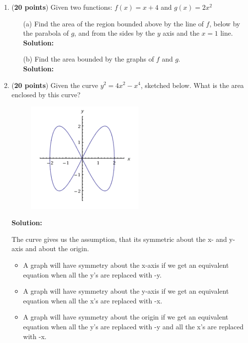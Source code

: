 \documentclass[a4paper]{article}
\begin{document}
\begin{enumerate}
	
\item (\textbf{20 points}) Given two functions: $f(x) = x + 4$ and $g(x) = 2x^2$

\begin{enumerate}
	\item[(a)] Find the area of the region bounded above by the line of $f$, below by the parabola of $g$, and from the sides by the $y$ axis and the $x = 1$ line.\\
	\textbf{Solution:}
	
	
	
	
	\item[(b)] Find the area bounded by the graphs of $f$ and $g$.\\
	\textbf{Solution:}
	
	
	
\end{enumerate}
	
\newpage	
	
	
	
	
	
\item (\textbf{20 points}) Given the curve $y^2 = 4x^2 - x^4$, sketched below. What is the area enclosed by this curve?\\
	
	\begin{figure}[ht]
	\centering
  \includegraphics[width=0.55\textwidth]{task.png}
\end{figure}	
	
	
\textbf{Solution:}	
	
The curve gives us the assumption, that its symmetric about the x- and y-axis and about the origin. 

\begin{itemize}
	\item A graph will have symmetry about the x-axis if we get an equivalent equation when all the y’s are replaced with -y.
	\item A graph will have symmetry about the y-axis if we get an equivalent equation when all the x’s are replaced with -x.
	\item A graph will have symmetry about the origin if we get an equivalent equation when all the y’s are replaced with -y and all the x’s are replaced with -x.
\end{itemize}	
	

\end{enumerate}
\end{document}
